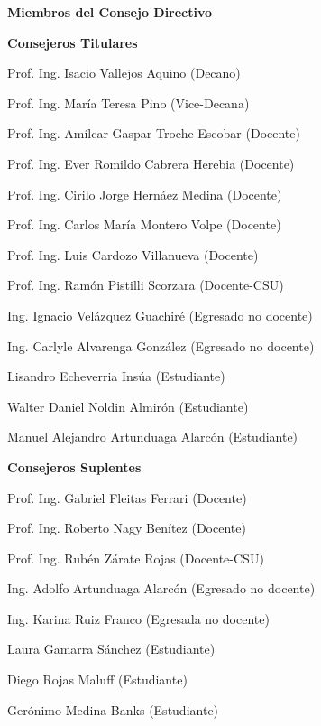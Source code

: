 \pagestyle{fancy}

\begin{center}
\textbf{Miembros del Consejo Directivo}
\end{center}
	\vspace{10mm}
	
\begin{center}
\textbf{Consejeros Titulares}
\end{center}

Prof. Ing. Isacio Vallejos Aquino (Decano)

Prof. Ing. María Teresa Pino (Vice-Decana)

Prof. Ing. Amílcar Gaspar Troche Escobar (Docente)

Prof. Ing. Ever Romildo Cabrera Herebia (Docente)

Prof. Ing. Cirilo Jorge Hernáez Medina (Docente)

Prof. Ing. Carlos María Montero Volpe (Docente)

Prof. Ing. Luis Cardozo Villanueva (Docente)

Prof. Ing. Ramón Pistilli Scorzara (Docente-CSU)

Ing. Ignacio Velázquez Guachiré (Egresado no docente)

Ing. Carlyle Alvarenga González (Egresado no docente)

Lisandro Echeverria Insúa (Estudiante)

Walter Daniel Noldin Almirón (Estudiante)

Manuel Alejandro Artunduaga Alarcón (Estudiante) 
	
	\vspace{10mm}
	
 
 \begin{center}
	\textbf{Consejeros Suplentes }
 \end{center}
	
Prof. Ing. Gabriel Fleitas Ferrari (Docente)

Prof. Ing. Roberto Nagy Benítez (Docente)

Prof. Ing. Rubén Zárate Rojas (Docente-CSU)

Ing. Adolfo Artunduaga Alarcón (Egresado no docente)

Ing. Karina Ruiz Franco (Egresada no docente)

Laura Gamarra Sánchez (Estudiante)

Diego Rojas Maluff (Estudiante)

Gerónimo Medina Banks (Estudiante)
	

\newpage


